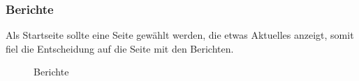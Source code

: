 \newpage
\FloatBarrier
\subsubsection{Berichte}\label{mockup_news}
Als Startseite sollte eine Seite gewählt werden, die etwas Aktuelles anzeigt, somit fiel die Entscheidung auf die Seite mit den Berichten.
\begin{figure}[ht]
\centering
{}
\label{fig:mockup_news}
\caption{Berichte}
\end{figure}

